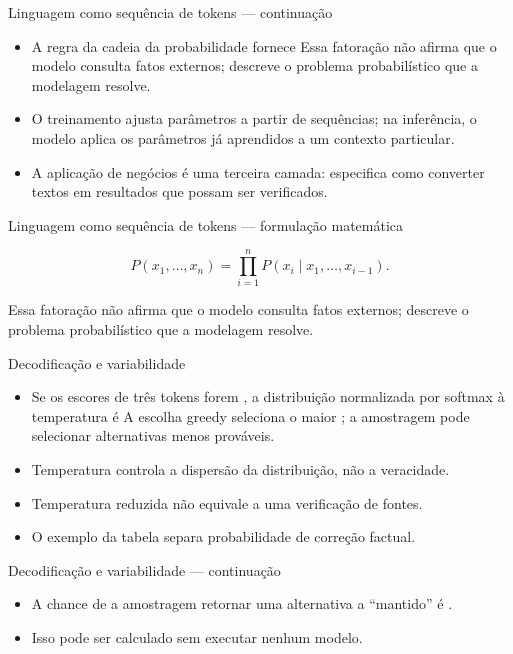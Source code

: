 \documentclass[10pt,aspectratio=169]{beamer}
\begin{document}
\begin{frame}[t]{Linguagem como sequência de tokens — continuação}
\small
\begin{itemize}
\item A regra da cadeia da probabilidade fornece Essa fatoração não afirma que o modelo consulta fatos externos; descreve o problema probabilístico que a modelagem resolve.
\item O treinamento ajusta parâmetros a partir de sequências; na inferência, o modelo aplica os parâmetros já aprendidos a um contexto particular.
\item A aplicação de negócios é uma terceira camada: especifica como converter textos em resultados que possam ser verificados.
\end{itemize}
\end{frame}

\begin{frame}[t]{Linguagem como sequência de tokens — formulação matemática}
\small
\vspace{3mm}\begin{center}\small\[P(x_1,\ldots,x_n)=\prod_{i=1}^{n}P(x_i\mid x_1,\ldots,x_{i-1}).\]\end{center}
\vspace{3mm}\small Essa fatoração não afirma que o modelo consulta fatos externos; descreve o problema probabilístico que a modelagem resolve.
\end{frame}

\begin{frame}[t]{Decodificação e variabilidade}
\small
\begin{itemize}
\item Se os escores de três tokens forem , a distribuição normalizada por softmax à temperatura é A escolha greedy seleciona o maior ; a amostragem pode selecionar alternativas menos prováveis.
\item Temperatura controla a dispersão da distribuição, não a veracidade.
\item Temperatura reduzida não equivale a uma verificação de fontes.
\item O exemplo da tabela separa probabilidade de correção factual.
\end{itemize}
\end{frame}

\begin{frame}[t]{Decodificação e variabilidade — continuação}
\small
\begin{itemize}
\item A chance de a amostragem retornar uma alternativa a ``mantido'' é .
\item Isso pode ser calculado sem executar nenhum modelo.
\end{itemize}
\end{frame}
\end{document}
